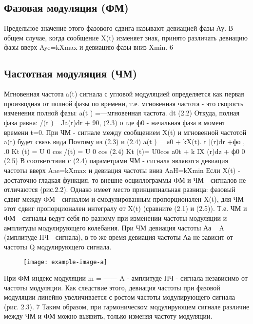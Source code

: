 ﻿\documentclass[a4paper,12pt]{article}
\begin{document}
\subsection{ Фазовая модуляция (ФМ)}
Предельное значение этого фазового сдвига называют девиацией фазы Ау. В общем случае, когда сообщение X(t) изменяет знак, принято различать девиацию фазы вверх Aye=kXmax и девиацию фазы вниз Xmin.
6
\subsection{Частотная модуляция (ЧМ)}
Мгновенная частота a(t) сигнала с угловой модуляцией определяется как первая производная от полной фазы по времени, т.е. мгновенная частота - это скорость изменения полной фазы:
a(t ) =---мгновенная частота.
dt
(2.2)
Откуда, полная фаза равна:
/(t )= Ja(r)dr + 90,
(2.3)
о
где ф0 - начальная фаза в момент времени t=0.
При ЧМ - сигнале между сообщением X(t) и мгновенной частотой a(t) будет связь
вида
Поэтому из (2.3) и (2.4)
a(t ) = а0 + kX(t).
t
|(r)dr +фо , .0 
Kt (t) = U 0 cos /(t) = U 0 cos
(2.4)
Kt (t)= U0cos
a0t + k IX (r)dz + ф0
0
(2.5)
В соответствии с (2.4) параметрами ЧМ - сигнала являются девиация частоты вверх Aae=kXmax и девиация частоты вниз AaH=kXmin
Если X(t) - достаточно гладкая функция, то внешне осциллограммы ФМ и ЧМ - сигналов не отличаются (рис.2.2). Однако имеет место принципиальная разница: фазовый сдвиг между ФМ - сигналом и
смодулированным пропорционален X(t), для ЧМ этот сдвиг пропорционален интегралу от X(t) (сравните (2.1) и (2.5)). Т.е. ЧМ и ФМ - сигналы ведут себя по-разному при изменении частоты модуляции и амплитуды модулирующего колебания.
При ЧМ девиация частоты Аа ~ A (амплитуде НЧ - сигнала), в то же время девиация частоты Аа не зависит от частоты Q модулирующего сигнала.
\begin{figure}[H]
	\centering
	\texttt{[image: example-image-a]}
	\caption{}
\end{figure}
При ФМ индекс модуляции m = —— A - амплитуде НЧ - сигнала независимо от
частоты модуляции. Как следствие этого, девиация частоты при фазовой модуляции линейно увеличивается с ростом частоты модулирующего сигнала (рис. 2.3).
7
Таким образом, при гармоническом модулирующем сигнале различие между ЧМ и ФМ можно выявить, только изменяя частоту модуляции.
\end{document}
